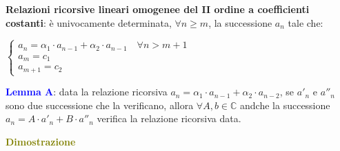 \newpage
\begin{flushleft}
    \textbf{Relazioni ricorsive lineari omogenee del II ordine a coefficienti costanti}: è univocamente determinata, $\forall n \geq m$, la successione $a_n$ tale che: 

    {\centering
        $\begin{cases}
            a_n = \alpha_1 \cdot a_{n-1} + \alpha_2 \cdot a_{n-1} \quad \forall n > m + 1\\
            a_m = c_1 \\
            a_{m+1} = c_2
        \end{cases}$
    \par}

    \textcolor{blue}{\textbf{Lemma A}}: data la relazione ricorsiva $a_n = \alpha_1 \cdot a_{n-1} + \alpha_2 \cdot a_{n-2}$, se $a'_n$ e $a''_n$ sono due successione che la verificano, allora $\forall A, b \in \mathbb{C}$ andche la successione $a_n = A \cdot a'_n + B \cdot a''_n$ verifica la relazione ricorsiva data.
    \begin{boxA}
        \textcolor{olive}{\textbf{Dimostrazione}}


\end{boxA}
\end{flushleft}
